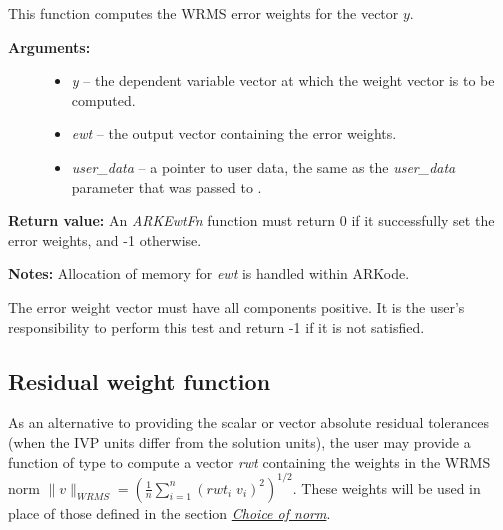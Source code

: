 \documentclass[letterpaper,10pt,english]{sphinxmanual}
\begin{document}
\begin{fulllineitems}
\label{c_interface/User_supplied:ARKEwtFn}
This function computes the WRMS error weights for the vector
$y$.
\begin{description}
\item[{\textbf{Arguments:}}] \leavevmode\begin{itemize}
\item {} 
\emph{y} -- the dependent variable vector at which the
weight vector is to be computed.

\item {} 
\emph{ewt} -- the output vector containing the error weights.

\item {} 
\emph{user\_data} -- a pointer to user data, the same as the
\emph{user\_data} parameter that was passed to {\hyperref[c_interface/User_callable:ARKodeSetUserData]{}}.

\end{itemize}

\end{description}

\textbf{Return value:}
An \emph{ARKEwtFn} function must return 0 if it
successfully set the error weights, and -1 otherwise.

\textbf{Notes:} Allocation of memory for \emph{ewt} is handled within ARKode.

The error weight vector must have all components positive.  It is
the user's responsibility to perform this test and return -1 if it
is not satisfied.

\end{fulllineitems}



\subsection{Residual weight function}
\label{c_interface/User_supplied:cinterface-residualweight}\label{c_interface/User_supplied:residual-weight-function}
As an alternative to providing the scalar or vector absolute residual
tolerances (when the IVP units differ from the solution units), the
user may provide a function of type {\hyperref[c_interface/User_supplied:ARKRwtFn]{}} to compute a
vector \emph{rwt} containing the weights in the WRMS norm
$\|v\|_{WRMS} = \left(\frac{1}{n} \sum_{i=1}^n \left(rwt_i\; v_i\right)^2
\right)^{1/2}$.  These weights will be used in place of those defined
in the section {\hyperref[Mathematics:mathematics-error-norm]{\emph{Choice of norm}}}.
\end{document}
